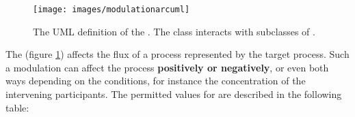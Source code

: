 






\label{defn:ModulationArc}

\begin{figure}[htb]
  \centering
  \texttt{[image: images/modulationarcuml]}
  \caption{The UML definition of the . The class interacts with
    subclasses of .}
  \label{fig:techref:modulationarcuml}
\end{figure}

The  (figure \ref{fig:techref:modulationarcuml})
affects the flux of a process represented by the target process. Such
a modulation can affect the process \textbf{positively or negatively},
or even both ways depending on the conditions, for instance the
concentration of the intervening participants. The permitted values
for  are described in the following table:

